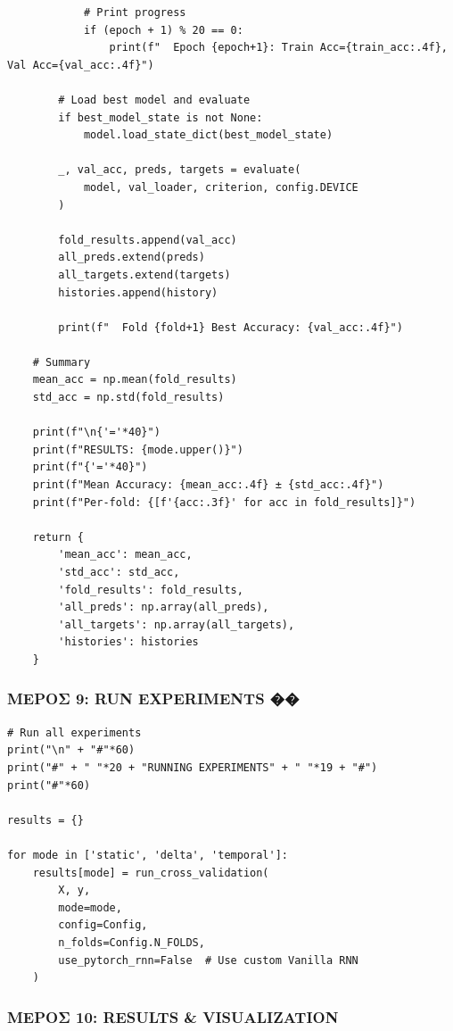 \begin{lstlisting}
            # Print progress
            if (epoch + 1) % 20 == 0:
                print(f"  Epoch {epoch+1}: Train Acc={train_acc:.4f}, Val Acc={val_acc:.4f}")
 
        # Load best model and evaluate
        if best_model_state is not None:
            model.load_state_dict(best_model_state)
 
        _, val_acc, preds, targets = evaluate(
            model, val_loader, criterion, config.DEVICE
        )
 
        fold_results.append(val_acc)
        all_preds.extend(preds)
        all_targets.extend(targets)
        histories.append(history)
 
        print(f"  Fold {fold+1} Best Accuracy: {val_acc:.4f}")
 
    # Summary
    mean_acc = np.mean(fold_results)
    std_acc = np.std(fold_results)
 
    print(f"\n{'='*40}")
    print(f"RESULTS: {mode.upper()}")
    print(f"{'='*40}")
    print(f"Mean Accuracy: {mean_acc:.4f} ± {std_acc:.4f}")
    print(f"Per-fold: {[f'{acc:.3f}' for acc in fold_results]}")
 
    return {
        'mean_acc': mean_acc,
        'std_acc': std_acc,
        'fold_results': fold_results,
        'all_preds': np.array(all_preds),
        'all_targets': np.array(all_targets),
        'histories': histories
    }
\end{lstlisting}
 
\subsubsection*{ΜΕΡΟΣ 9: RUN EXPERIMENTS ��}
 
\begin{lstlisting}
# Run all experiments
print("\n" + "#"*60)
print("#" + " "*20 + "RUNNING EXPERIMENTS" + " "*19 + "#")
print("#"*60)
 
results = {}
 
for mode in ['static', 'delta', 'temporal']:
    results[mode] = run_cross_validation(
        X, y,
        mode=mode,
        config=Config,
        n_folds=Config.N_FOLDS,
        use_pytorch_rnn=False  # Use custom Vanilla RNN
    )
\end{lstlisting}
 
\subsubsection*{ΜΕΡΟΣ 10: RESULTS \& VISUALIZATION}
 
